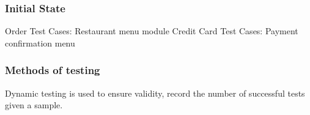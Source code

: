 \documentclass[12pt]{article}
\begin{document}

\subsubsection{Initial State}
Order Test Cases: Restaurant menu module
Credit Card Test Cases: Payment confirmation menu
\subsubsection{Methods of testing}
Dynamic testing is used to ensure validity, record the number of successful tests given a sample.
\end{document}
